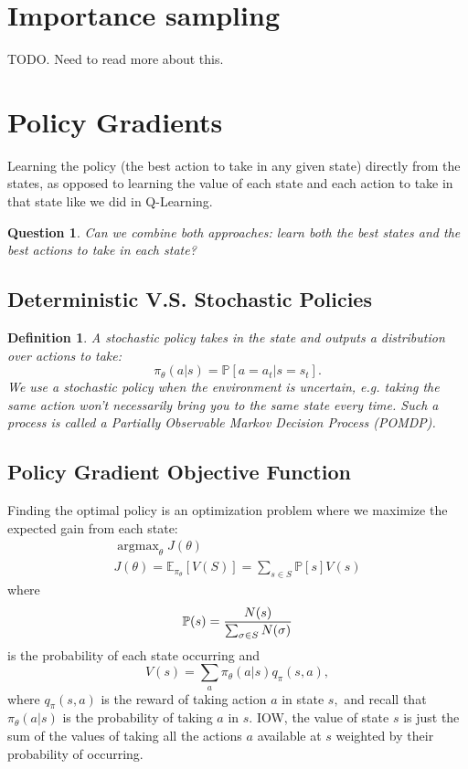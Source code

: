 \documentclass[10pt]{article}
\theoremstyle{plain}
\newtheorem{question}[theorem]{Question}
\newtheorem{definition}[theorem]{Definition}
\theoremstyle{definition}
\theoremstyle{remark}
\renewcommand\frac[2]{\genfrac{}{}{0.5pt}{}{#1}{#2}}
\DeclareMathOperator{\argmax}{argmax}
\newcommand{\hE}{\mathbb E}
\newcommand{\hP}{\mathbb P}
\newcommand{\0}{\varnothing}
\newcommand{\<}{\langle}
\renewcommand{\>}{\rangle}
\begin{document}
\section{Importance sampling}

TODO. Need to read more about this.


\section{Policy Gradients}

Learning the policy (the best action to take in any given state) directly from the states, as opposed to learning the value of each state and each action to take in that state like we did in Q-Learning.

\begin{question}
  Can we combine both approaches: learn both the best states and the best actions to take in each state?
\end{question}

\subsection{Deterministic V.S. Stochastic Policies}

\begin{definition}
  A stochastic policy takes in the state and outputs a distribution over actions to take: $$
  \pi_\theta(a|s) = \hP[a = a_t | s = s_t].
$$ We use a stochastic policy when the environment is uncertain, e.g. taking the same action won't necessarily bring you to the same state every time. Such a process is called a Partially Observable Markov Decision Process (POMDP).
\end{definition}

\subsection{Policy Gradient Objective Function}

Finding the optimal policy is an optimization problem where we maximize the expected gain from each state:
\begin{gather*}
\argmax_\theta  J(\theta) \\
J(\theta) = \hE_{\pi_\theta}[V(S)] = \sum_{s\in S} \hP[s] V(s)
\end{gather*}
where $$
  \hP(s) = \frac{N(s)}{\sum_{\sigma\in S} N(\sigma)}
$$
is the probability of each state occurring and $$
  V(s) = \sum_{a} \pi_\theta(a|s) q_\pi(s, a),
$$
where $ q_\pi(s, a) $ is the reward of taking action $ a $ in state $ s, $ and recall that $ \pi_\theta(a|s) $ is the probability of taking $ a $ in $ s. $ IOW, the value of state $ s $ is just the sum of the values of taking all the actions $ a $ available at $ s $ weighted by their probability of occurring.
\end{document}
